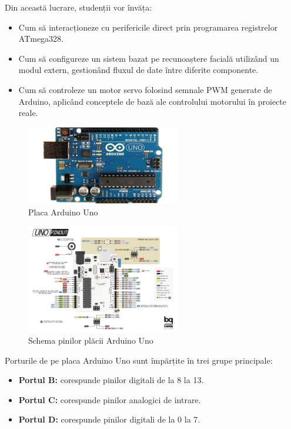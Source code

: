 \documentclass{report}
\begin{document}
Din această lucrare, studenții vor învăța:
\begin{itemize}
    \item Cum să interacționeze cu perifericile direct prin programarea registrelor ATmega328.
    \item Cum să configureze un sistem bazat pe recunoaștere facială utilizând un modul extern, gestionând fluxul de date între diferite componente.
    \item Cum să controleze un motor servo folosind semnale PWM generate de Arduino, aplicând conceptele de bază ale controlului motorului în proiecte reale.
\end{itemize}

\begin{figure}[H]
    \centering
    \includegraphics[width=0.6\textwidth]{arduino.png}
    \caption{Placa Arduino Uno}
    \label{fig:arduino}
\end{figure}

\begin{figure}[H]
    \centering
    \includegraphics[width=0.6\textwidth]{Arduino-uno-pinout.png}
    \caption{Schema pinilor plăcii Arduino Uno}
    \label{fig:arduino_pinout}
\end{figure}


\newapge
\vspace*{1cm}
Porturile de pe placa Arduino Uno sunt împărțite în trei grupe principale:

\begin{itemize}
    \item \textbf{Portul B:} corespunde pinilor digitali de la 8 la 13.
    \item \textbf{Portul C:} corespunde pinilor analogici de intrare.
    \item \textbf{Portul D:} corespunde pinilor digitali de la 0 la 7.
\end{itemize}
\end{document}
